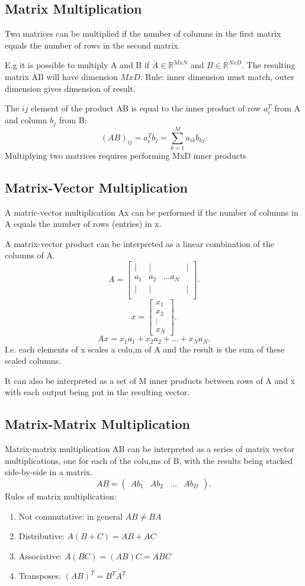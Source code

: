 \documentclass[a4paper]{article}
\newcommand{\R}{\mathbb{R}}
\newcommand{\0}{\mathbb{\emptyset}}
\begin{document}
	\subsection{Matrix Multiplication}
	Two matrices can be multiplied if the number of columns in the first
	matrix equals the number of rows in the second matrix. \par
	E.g it is possible to multiply A and B if $A \in \R^{MxN}$ and $B \in
	\R^{NxD}$. The resulting matrix AB will have dimension $MxD$. Rule:
	inner dimension must match, outer dimension gives dimension of result.
	\par
	The $ij$ element of the product AB is equal to the inner product of row
	$a_i^T$ from A and column $b_j$ from B:
	\[
		(AB)_{ij}=a_i^Tb_j = \sum_{k=1}^{M}a_{ik}b_{kj}
	.\] 
	Multiplying two matrices requires performing MxD inner products
	\subsection{Matrix-Vector Multiplication}
	A matric-vector multiplication Ax can be performed if the number of
	columns in A equals the number of rows (entries) in x. \par
	A matrix-vector product can be interpreted as a linear combination of
	the columns of A.
	\[
		A = \begin{bmatrix}  \mid &  \mid & &  \mid \\
		a_1 & a_2 & \ldots a_N \\
	        \mid &  \mid & &  \mid \\\end{bmatrix} 
	.\] 
	\[
	x = \begin{bmatrix} x_1 \\ x_2 \\ \vdots \\ x_N \end{bmatrix} 
	.\] 
	\[
	Ax = x_1a_1 + x_2a_2 + \ldots + x_Na_N
	.\] 
	I.e. each elements of x scales a colu,m of A and the result is the sum
	of these scaled columns. \par
	It can also be interpreted as a set of M inner products between rows of
	A and x with each output being put in the resulting vector.
	\subsection{Matrix-Matrix Multiplication}
	Matrix-matrix multiplication AB can be interpreted as a series of matrix
	vector multiplications, one for each of the colu,ms of B, with the
	results being stacked side-by-side in a matrix.
	\[
		AB = \begin{pmatrix} Ab_1 & Ab_2 & \ldots & Ab_D \end{pmatrix} 
	.\] 
	Rules of matrix multiplication:
	\begin{enumerate}
		\item Not commutative: in general $AB \neq BA$ 
		\item Distributive: $A(B+C) = AB + AC$ 
		\item Associative: $A(BC) = (AB)C = ABC$ 
		\item Transposes: $(AB)^T = B^TA^T$
	\end{enumerate}
\end{document}
